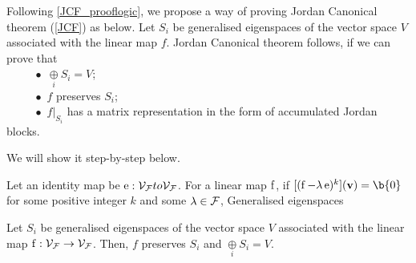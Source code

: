 \newpage

\noindent Following \cref{JCF_prooflogic}, we propose a way of proving Jordan Canonical theorem (\cref{JCF}) as below.
Let $S_i$ be generalised eigenspaces of the vector space $V$ associated with the linear map $f$.
Jordan Canonical theorem follows, if we can prove that \\
$~\ \qquad \bullet$ $\underset{i}{\oplus} S_i = V$;\\
$~\ \qquad \bullet$ $f$ preserves $S_i$; \\
$~\ \qquad \bullet$ $f|_{S_i}$ has a matrix representation in the form of accumulated Jordan blocks.

\noindent We will show it step-by-step below.


\begin{definition}
Let an identity map be $\operatorname{e}:\mathcal{V}_{\mathcal{F}} to \mathcal{V}_{\mathcal{F}}$.
For a linear map $\operatorname{f}$, if $[(\f - \lambda \operatorname{e})^k] (\vv) = \b{0}$ for some positive integer $k$ and some $\lambda \in {\mathcal{F}}$, 
Generalised eigenspaces
\end{definition}

\begin{theorem}
Let $S_i$ be generalised eigenspaces of the vector space $V$ associated with the linear map $\operatorname{f}: \mathcal{V}_{\mathcal{F}} \to \mathcal{V}_{\mathcal{F}}$. 
Then, $f$ preserves $S_i$ and $\underset{i}{\oplus} S_i = V$.
\end{theorem}









